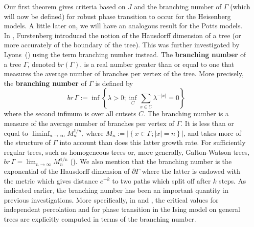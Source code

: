 Our first theorem gives criteria based on $J$ and the branching number
of $\Gamma$ (which will now be defined) for robust phase transition to
occur for the Heisenberg models. A little later on, we will have an analogous
result for the Potts models. In \cite{F}, Furstenberg introduced the notion
of the Hausdorff dimension of a tree (or more accurately of the boundary of 
the tree). This was further investigated by Lyons~(\cite{Ly2}) using the 
term branching number instead.
The {\bf branching number} of a tree $\Gamma$, denoted
$\textstyle {br} (\Gamma)$, is a real number greater than or equal to one
that measures the average number of branches per vertex of the
tree. More precisely, the {\bf branching number} of $\Gamma$ is defined by
$$\textstyle{br}\,\Gamma:=\inf\left\{\lambda>0;\inf\limits_{C}
\sum_{x \in C}\lambda^{-|x|} = 0 \right \} \;$$
where the second infimum is over all cutsets $C$.
The branching number is a measure of the average number of
branches per vertex of $\Gamma$.
It is  less than or equal to $\liminf_{n \to \infty} M_n^{1/n}$, where
$M_n := | \left \{x \in \Gamma ; |x| = n \right \}|$,
and takes more of the structure of $\Gamma$ into account
than does this latter growth rate.
For sufficiently regular trees, such as homogeneous trees or, more generally,
Galton-Watson trees, $\textstyle{br}\, \Gamma = \lim_{n\to\infty}
M_n^{1/n}$ (\cite{Ly2}). We also mention that the branching number is the
exponential of the Hausdorff dimension of $\partial\Gamma$ where the latter
is endowed with the
metric which gives distance $e^{-k}$ to two paths which split off after $k$
steps. As indicated earlier, the branching number has been an important
quantity in previous investigations. More specifically, in \cite{Ly1} and
\cite{Ly2}, the critical values for independent percolation and
for phase transition in the Ising model on general trees 
are explicitly computed in terms of the branching number.

